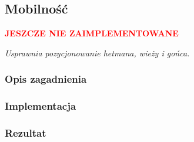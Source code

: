 \subsection{Mobilność}
\label{subsec:mobilnosc}
\begin{center}
    \textcolor{red}{\textbf{JESZCZE NIE ZAIMPLEMENTOWANE}}
\end{center}
\textit{Usprawnia pozycjonowanie hetmana, wieży i gońca.}


\subsubsection{Opis zagadnienia}
\subsubsection{Implementacja}
\subsubsection{Rezultat}